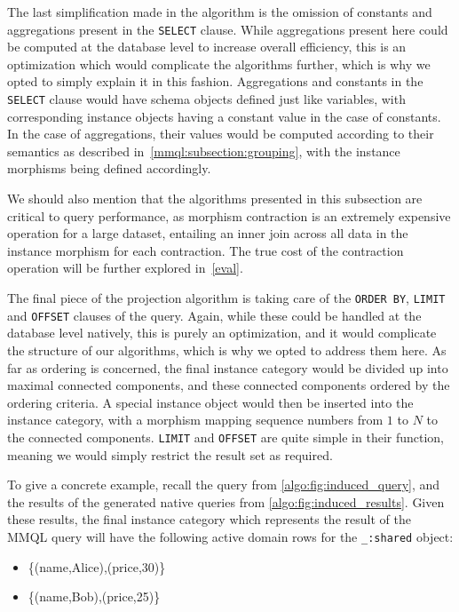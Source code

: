 The last simplification made in the algorithm is the omission of constants and aggregations present in the \texttt{SELECT} clause.
While aggregations present here could be computed at the database level to increase overall efficiency, this is an optimization which would complicate the algorithms further, which is why we opted to simply explain it in this fashion.
Aggregations and constants in the \texttt{SELECT} clause would have schema objects defined just like variables, with corresponding instance objects having a constant value in the case of constants.
In the case of aggregations, their values would be computed according to their semantics as described in~\cref{mmql:subsection:grouping}, with the instance morphisms being defined accordingly.

We should also mention that the algorithms presented in this subsection are critical to query performance, as morphism contraction is an extremely expensive operation for a large dataset, entailing an inner join across all data in the instance morphism for each contraction.
The true cost of the contraction operation will be further explored in~\cref{eval}.

The final piece of the projection algorithm is taking care of the \texttt{ORDER BY}, \texttt{LIMIT} and \texttt{OFFSET} clauses of the query.
Again, while these could be handled at the database level natively, this is purely an optimization, and it would complicate the structure of our algorithms, which is why we opted to address them here.
As far as ordering is concerned, the final instance category would be divided up into maximal connected components, and these connected components ordered by the ordering criteria.
A special instance object would then be inserted into the instance category, with a morphism mapping sequence numbers from $1$ to $N$ to the connected components.
\texttt{LIMIT} and \texttt{OFFSET} are quite simple in their function, meaning we would simply restrict the result set as required.

To give a concrete example, recall the query from \cref{algo:fig:induced_query}, and the results of the generated native queries from \cref{algo:fig:induced_results}.
Given these results, the final instance category which represents the result of the MMQL query will have the following active domain rows for the \texttt{\_:shared} object:

\begin{itemize}
    \item \{(name,Alice),(price,30)\}
    \item \{(name,Bob),(price,25)\}
\end{itemize}

